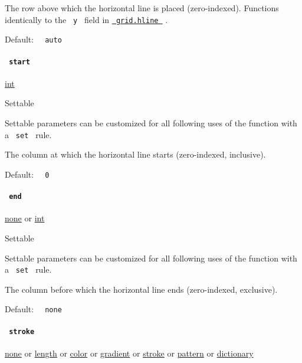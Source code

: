 The row above which the horizontal line is placed (zero-indexed).
Functions identically to the \texttt{\ y\ } field in
\href{/docs/reference/layout/grid/\#definitions-hline-y}{\texttt{\ grid.hline\ }}
.

Default: \texttt{\ }{\texttt{\ auto\ }}\texttt{\ }

\paragraph{\texorpdfstring{\texttt{\ start\ }}{ start }}\label{definitions-hline-start}

\href{/docs/reference/foundations/int/}{int}

{{ Settable }}

\label{definitions-hline-start-settable-tooltip}
Settable parameters can be customized for all following uses of the
function with a \texttt{\ set\ } rule.

The column at which the horizontal line starts (zero-indexed,
inclusive).

Default: \texttt{\ }{\texttt{\ 0\ }}\texttt{\ }

\paragraph{\texorpdfstring{\texttt{\ end\ }}{ end }}\label{definitions-hline-end}

\href{/docs/reference/foundations/none/}{none} {or}
\href{/docs/reference/foundations/int/}{int}

{{ Settable }}

\label{definitions-hline-end-settable-tooltip}
Settable parameters can be customized for all following uses of the
function with a \texttt{\ set\ } rule.

The column before which the horizontal line ends (zero-indexed,
exclusive).

Default: \texttt{\ }{\texttt{\ none\ }}\texttt{\ }

\paragraph{\texorpdfstring{\texttt{\ stroke\ }}{ stroke }}\label{definitions-hline-stroke}

\href{/docs/reference/foundations/none/}{none} {or}
\href{/docs/reference/layout/length/}{length} {or}
\href{/docs/reference/visualize/color/}{color} {or}
\href{/docs/reference/visualize/gradient/}{gradient} {or}
\href{/docs/reference/visualize/stroke/}{stroke} {or}
\href{/docs/reference/visualize/pattern/}{pattern} {or}
\href{/docs/reference/foundations/dictionary/}{dictionary}

